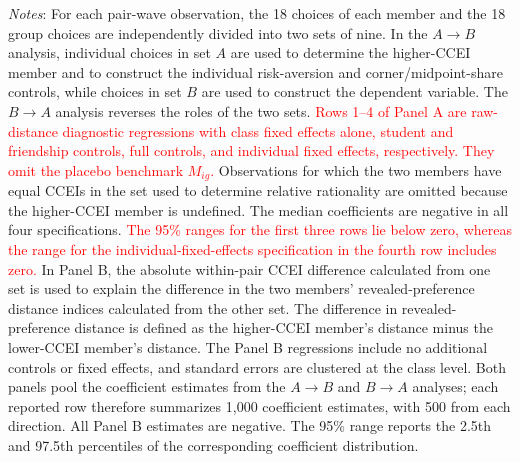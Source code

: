 \documentclass[11 pt]{article}
\begin{document}
\begin{table}[H]
{\begin{minipage}{\textwidth}
{\footnotesize \emph{Notes}: For each pair-wave observation, the 18 choices of each member and the 18 group choices are independently divided into two sets of nine. In the $A\rightarrow B$ analysis, individual choices in set $A$ are used to determine the higher-CCEI member and to construct the individual risk-aversion and corner/midpoint-share controls, while choices in set $B$ are used to construct the dependent variable. The $B\rightarrow A$ analysis reverses the roles of the two sets. \textcolor{red}{Rows 1--4 of Panel A are raw-distance diagnostic regressions with class fixed effects alone, student and friendship controls, full controls, and individual fixed effects, respectively. They omit the placebo benchmark $M_{ig}$.} Observations for which the two members have equal CCEIs in the set used to determine relative rationality are omitted because the higher-CCEI member is undefined. The median coefficients are negative in all four specifications. \textcolor{red}{The 95\% ranges for the first three rows lie below zero, whereas the range for the individual-fixed-effects specification in the fourth row includes zero.} In Panel B, the absolute within-pair CCEI difference calculated from one set is used to explain the difference in the two members' revealed-preference distance indices calculated from the other set. The difference in revealed-preference distance is defined as the higher-CCEI member's distance minus the lower-CCEI member's distance. The Panel B regressions include no additional controls or fixed effects, and standard errors are clustered at the class level. Both panels pool the coefficient estimates from the $A\rightarrow B$ and $B\rightarrow A$ analyses; each reported row therefore summarizes 1,000 coefficient estimates, with 500 from each direction. All Panel B estimates are negative. The 95\% range reports the 2.5th and 97.5th percentiles of the corresponding coefficient distribution.}
\end{minipage}
}
\end{table}
\end{document}
